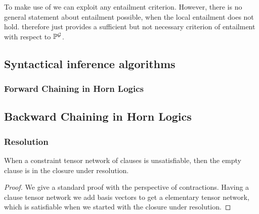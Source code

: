 \begin{remark}
    To make use of  we can exploit any entailment criterion.
    However, there is no general statement about entailment possible, when the local entailment does not hold.
     therefore just provides a sufficient but not necessary criterion of entailment with respect to $\mathbb{P}^{\mathcal{G}}$.
\end{remark}

\subsection{Syntactical inference algorithms}


\subsubsection{Forward Chaining in Horn Logics}


\subsection{Backward Chaining in Horn Logics}


\subsubsection{Resolution}

\begin{theorem}
    When a constraint tensor network of clauses is unsatisfiable, then the empty clause is in the closure under resolution.
\end{theorem}
\begin{proof}
    We give a standard proof \cite{russell_artificial_2021} with the perspective of contractions.
    Having a clause tensor network we add basis vectors to get a elementary tensor network, which is satisfiable when we started with the closure under resolution.
\end{proof}

